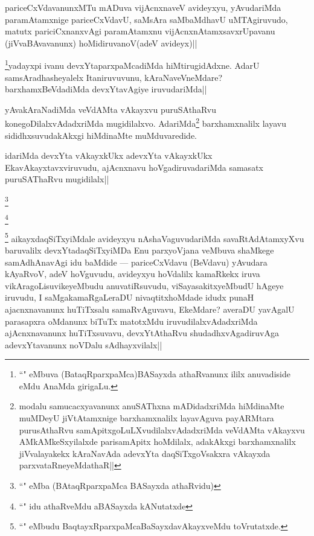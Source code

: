 
\begin{artha}
pariceCxVdavanunxMTu mADuva vijAcnxnaveV avideyxyu, yAvudariMda paramAtamxnige 
pariceCxVdavU, saMsAra saMbaMdhavU uMTAgiruvudo, matutx pariciCxnanxvAgi paramAtamxnu 
vijAcnxnAtamxsavxrUpavanu (jiVvaBAvavanunx) hoMidiruvanoV(adeV avideyx)||
\end{artha}

\begin{artha}
\footnote[1]{``\stext" eMbuva (BataqRparxpaMca)BASayxda athaRvanunx ililx anuvadiside eMdu AnaMda girigaLu.}yadayxpi ivanu devxYtaparxpaMcadiMda hiMtirugidAdxne. AdarU samsAradhasheyalelx Itaniruvuvunu, kAraNaveVneMdare? barxhamxBeVdadiMda devxYtavAgiye iruvudariMda||
\end{artha}

\begin{artha}
yAvakAraNadiMda veVdAMta vAkayxvu puruSAthaRvu konegoDilalxvAdadxriMda mugidilalxvo. AdariMda\footnote[2]{modalu samucacxyavanunx anuSAThxna mADidadxriMda hiMdinaMte muMDeyU jiVtAtamxnige barxhamxnalilx layavAguva payARMtara purusAthaRvu samApitxgoLuLXvudilalxvAdadxriMda veVdAMta vAkayxvu AMkAMkeSxyilalxde parisamApitx hoMdilalx, adakAkxgi barxhamxnalilx jiVvalayakekx kAraNavAda adevxYta daqSiTxgoVsakxra vAkayxda parxvataRneyeMdathaR||} barxhamxnalilx layavu sididhxsuvudakAkxgi hiMdinaMte muMduvaredide.
\end{artha}

\begin{artha}
idariMda devxYta vAkayxkUkx adevxYta vAkayxkUkx EkavAkayxtavxviruvudu, ajAcnxnavu hoVgadiruvadariMda samasatx puruSAThaRvu mugidilalx|| 
\end{artha}

\begin{artha}
\footnote[1]{``\stext" eMba (BAtaqRparxpaMca BASayxda athaRvidu)}
\end{artha}

\begin{artha}
\footnote[2]{``\stext" idu athaRveMdu aBASayxda kANutatxde }
\end{artha}

\begin{artha}
\footnote[3]{``\stext" eMbudu BaqtayxRparxpaMcaBaSayxdavAkayxveMdu toVrutatxde.} aikayxdaqSiTxyiMdale avideyxyu nAshaVaguvudariMda savaRtAdAtamxyXvu baruvalilx devxYtadaqSiTxyiMDa Enu parxyoVjana veMbuva shaMkege samAdhAnavAgi idu baMdide --- pariceCxVdavu (BeVdavu) yAvudara kAyaRvoV, adeV hoVguvudu, avideyxyu hoVdalilx kamaRkekx iruva vikAragoLisuvikeyeMbudu anuvatiRsuvudu, viSayasakitxyeMbudU hAgeye iruvudu, I saMgakamaRgaLeraDU nivaqtitxhoMdade idudx punaH ajacnxnavanunx huTiTxsalu samaRvAguvavu, EkeMdare? averaDU yavAgalU parasapxra oMdanunx biTuTx matotxMdu iruvudilalxvAdadxriMda ajAcnxnavanunx huTiTxsuvavu, devxYtAthaRvu shudadhxvAgadiruvAga adevxYtavanunx noVDalu sAdhayxvilalx||
\end{artha}


